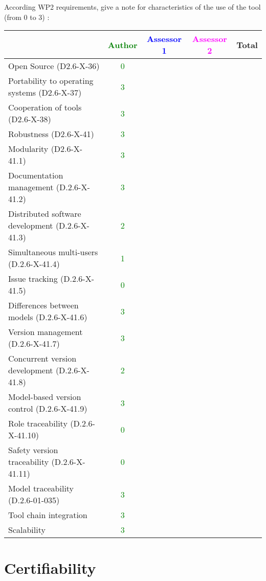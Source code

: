 According WP2 requirements, give a note for characteristics of the use of the tool (from 0 to 3) :

\begin{tabular}{|l | c | c | c | c|}
\hline
& \textcolor{green}{Author} & \textcolor{blue}{Assessor 1} & \textcolor{magenta}{Assessor 2} & Total \\
\hline 
Open Source (D2.6-X-36) &  \textcolor{green}{0}& & &  \\
\hline 
Portability to operating systems (D2.6-X-37) &  \textcolor{green}{3}& & &  \\
\hline
Cooperation of tools (D2.6-X-38) &  \textcolor{green}{3}& & &  \\
\hline
Robustness (D2.6-X-41) &  \textcolor{green}{3}& & & \\
\hline
Modularity (D2.6-X-41.1) &  \textcolor{green}{3}& & & \\
\hline
Documentation management (D.2.6-X-41.2) &  \textcolor{green}{3}& & & \\
\hline
Distributed software development (D.2.6-X-41.3)  &  \textcolor{green}{2}& & & \\
\hline
Simultaneous multi-users (D.2.6-X-41.4)   &  \textcolor{green}{1}& & & \\
\hline
Issue tracking (D.2.6-X-41.5) &  \textcolor{green}{0}& & & \\
\hline
Differences between models (D.2.6-X-41.6) &  \textcolor{green}{3}& & & \\
\hline
Version management (D.2.6-X-41.7) &  \textcolor{green}{3}& & & \\
\hline
Concurrent version development (D.2.6-X-41.8) &  \textcolor{green}{2}& & & \\
\hline
Model-based version control (D.2.6-X-41.9) &  \textcolor{green}{3}& & & \\
\hline
Role traceability (D.2.6-X-41.10) &  \textcolor{green}{0}& & & \\
\hline
Safety version traceability (D.2.6-X-41.11) &  \textcolor{green}{0}& & & \\
\hline
Model traceability (D.2.6-01-035) & \textcolor{green}{3} & & & \\
\hline
Tool chain integration & \textcolor{green}{3} & & & \\
\hline
Scalability & \textcolor{green}{3} & & & \\
\hline
\end{tabular}

\section{Certifiability}

